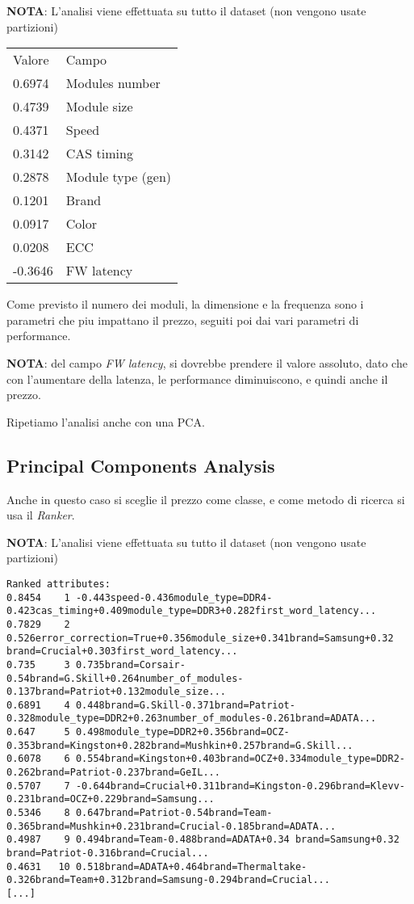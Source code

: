 \documentclass[12pt]{report}
\begin{document}
\textbf{NOTA}: L'analisi viene effettuata su tutto il dataset (non vengono usate partizioni)
\begin{table}[!htb]
	\centering
	\begin{tabular}{ll}
		Valore  & Campo             \\
		0.6974  & Modules number    \\
		0.4739  & Module size       \\
		0.4371  & Speed             \\
		0.3142  & CAS timing        \\
		0.2878  & Module type (gen) \\
		0.1201  & Brand             \\
		0.0917  & Color             \\
		0.0208  & ECC               \\
		-0.3646 & FW latency       
	\end{tabular}
\end{table}

Come previsto il numero dei moduli, la dimensione e la frequenza sono i parametri che piu impattano
il prezzo, seguiti poi dai vari parametri di performance.

\textbf{NOTA}: del campo \textit{FW latency}, si dovrebbe prendere il valore assoluto, dato che con
l'aumentare della latenza, le performance diminuiscono, e quindi anche il prezzo.

Ripetiamo l'analisi anche con una PCA.

\newpage
\subsection{Principal Components Analysis}
Anche in questo caso si sceglie il prezzo come classe, e come metodo di ricerca si usa il \textit{Ranker}.

\textbf{NOTA}: L'analisi viene effettuata su tutto il dataset (non vengono usate partizioni)

\begin{lstlisting}[breaklines=true]
Ranked attributes:
0.8454    1 -0.443speed-0.436module_type=DDR4-0.423cas_timing+0.409module_type=DDR3+0.282first_word_latency...
0.7829    2 0.526error_correction=True+0.356module_size+0.341brand=Samsung+0.32 brand=Crucial+0.303first_word_latency...
0.735     3 0.735brand=Corsair-0.54brand=G.Skill+0.264number_of_modules-0.137brand=Patriot+0.132module_size...
0.6891    4 0.448brand=G.Skill-0.371brand=Patriot-0.328module_type=DDR2+0.263number_of_modules-0.261brand=ADATA...
0.647     5 0.498module_type=DDR2+0.356brand=OCZ-0.353brand=Kingston+0.282brand=Mushkin+0.257brand=G.Skill...
0.6078    6 0.554brand=Kingston+0.403brand=OCZ+0.334module_type=DDR2-0.262brand=Patriot-0.237brand=GeIL...
0.5707    7 -0.644brand=Crucial+0.311brand=Kingston-0.296brand=Klevv-0.231brand=OCZ+0.229brand=Samsung...
0.5346    8 0.647brand=Patriot-0.54brand=Team-0.365brand=Mushkin+0.231brand=Crucial-0.185brand=ADATA...
0.4987    9 0.494brand=Team-0.488brand=ADATA+0.34 brand=Samsung+0.32 brand=Patriot-0.316brand=Crucial...
0.4631   10 0.518brand=ADATA+0.464brand=Thermaltake-0.326brand=Team+0.312brand=Samsung-0.294brand=Crucial...
[...]
\end{lstlisting}
\end{document}
